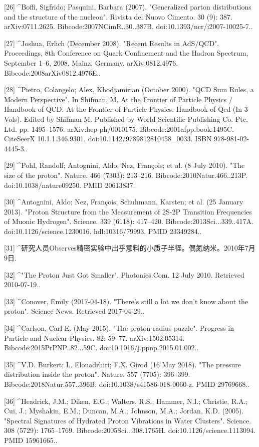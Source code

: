 [26]
^Boffi, Sigfrido; Pasquini, Barbara (2007). "Generalized parton distributions and the structure of the nucleon". Rivista del Nuovo Cimento. 30 (9): 387. arXiv:0711.2625. Bibcode:2007NCimR..30..387B. doi:10.1393/ncr/i2007-10025-7..

[27]
^Joshua, Erlich (December 2008). "Recent Results in AdS/QCD". Proceedings, 8th Conference on Quark Confinement and the Hadron Spectrum, September 1–6, 2008, Mainz, Germany. arXiv:0812.4976. Bibcode:2008arXiv0812.4976E..

[28]
^Pietro, Colangelo; Alex, Khodjamirian (October 2000). "QCD Sum Rules, a Modern Perspective". In Shifman, M. At the Frontier of Particle Physics / Handbook of QCD. At the Frontier of Particle Physics: Handbook of Qcd (In 3 Vols). Edited by Shifman M. Published by World Scientific Publishing Co. Pte. Ltd. pp. 1495–1576. arXiv:hep-ph/0010175. Bibcode:2001afpp.book.1495C. CiteSeerX 10.1.1.346.9301. doi:10.1142/9789812810458_0033. ISBN 978-981-02-4445-3..

[29]
^Pohl, Randolf; Antognini, Aldo; Nez, François; et al. (8 July 2010). "The size of the proton". Nature. 466 (7303): 213–216. Bibcode:2010Natur.466..213P. doi:10.1038/nature09250. PMID 20613837..

[30]
^Antognini, Aldo; Nez, François; Schuhmann, Karsten; et al. (25 January 2013). "Proton Structure from the Measurement of 2S-2P Transition Frequencies of Muonic Hydrogen". Science. 339 (6118): 417–420. Bibcode:2013Sci...339..417A. doi:10.1126/science.1230016. hdl:10316/79993. PMID 23349284..

[31]
^研究人员Observes精密实验中出乎意料的小质子半径。偶氮纳米。2010年7月9日.

[32]
^"The Proton Just Got Smaller". Photonics.Com. 12 July 2010. Retrieved 2010-07-19..

[33]
^Conover, Emily (2017-04-18). "There's still a lot we don't know about the proton". Science News. Retrieved 2017-04-29..

[34]
^Carlson, Carl E. (May 2015). "The proton radius puzzle". Progress in Particle and Nuclear Physics. 82: 59–77. arXiv:1502.05314. Bibcode:2015PrPNP..82...59C. doi:10.1016/j.ppnp.2015.01.002..

[35]
^V.D. Burkert; L. Elouadrhiri; F.X. Girod (16 May 2018). "The pressure distribution inside the proton". Nature. 557 (7705): 396–399. Bibcode:2018Natur.557..396B. doi:10.1038/s41586-018-0060-z. PMID 29769668..

[36]
^Headrick, J.M.; Diken, E.G.; Walters, R.S.; Hammer, N.I.; Christie, R.A.; Cui, J.; Myshakin, E.M.; Duncan, M.A.; Johnson, M.A.; Jordan, K.D. (2005). "Spectral Signatures of Hydrated Proton Vibrations in Water Clusters". Science. 308 (5729): 1765–1769. Bibcode:2005Sci...308.1765H. doi:10.1126/science.1113094. PMID 15961665..


